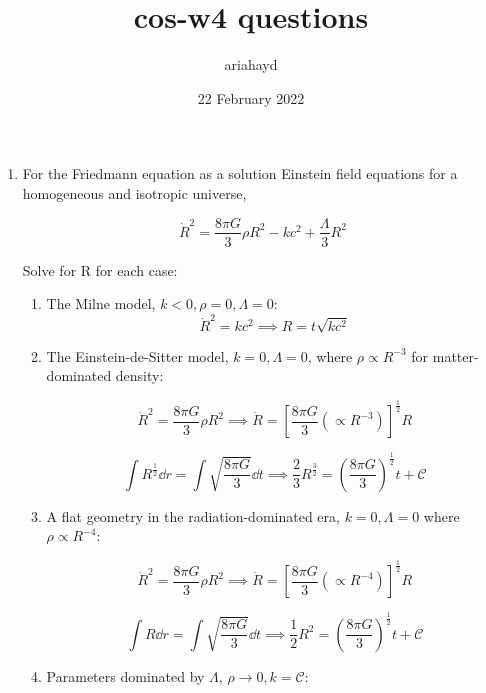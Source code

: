 \documentclass{paper}
\title{cos-w4 questions}
\author{ariahayd}
\date{22 February 2022}
\begin{document}
 

\maketitle

\begin{enumerate}
    \item %
      For the Friedmann equation as a solution Einstein field equations for
      a homogeneous and isotropic universe,

      \begin{equation}
        \dot{R}^2 = \frac{8 \pi G}{3}\rho R^2 - k c^2 + \frac{\Lambda}{3} R^2
        \label{eq:friedmann}
      \end{equation}

      Solve for R for each case:

      \begin{enumerate}
        \item
          The Milne model, \(k < 0, \rho = 0, \Lambda = 0\):
          \[ \dot{R}^2 = k c^2 \implies R = t \sqrt{kc^2} \]

        \item
          The Einstein-de-Sitter model, \(k = 0, \Lambda =0\), where 
          \(\rho \propto R^{-3}\) for matter-dominated density:

          \[ 
          \dot{R}^2 = \frac{8 \pi G}{3}\rho R^2 \implies
          \dot{R} = 
          \left[\frac{8 \pi G}{3}(\propto R^{-3})\right]^{\frac{1}{2}} R
          \] 

          \[
          \int R^{\frac{1}{2}}\dd{r} = \int \sqrt{\frac{8 \pi G}{3}}\dd{t}
          \implies \frac{2}{3}R^{\frac{3}{2}} 
          = \left(\frac{8 \pi G}{3}\right)^\frac{1}{2} t + \mathcal{C} 
          \]

        \item
          A flat geometry in the radiation-dominated era, 
          \(k = 0, \Lambda = 0 \) where \(\rho \propto R^{-4}\):

          \[ 
          \dot{R}^2 = \frac{8 \pi G}{3}\rho R^2 \implies
          \dot{R} = 
          \left[\frac{8 \pi G}{3}(\propto R^{-4})\right]^{\frac{1}{2}} R
          \] 

          \[
          \int R\dd{r} = \int \sqrt{\frac{8 \pi G}{3}}\dd{t}
          \implies \frac{1}{2}R^{2} 
          = \left(\frac{8 \pi G}{3}\right)^\frac{1}{2} t + \mathcal{C} 
          \]

        \item
          Parameters dominated by \(\Lambda\), \(\rho 
          \rightarrow 0, k=\mathcal{C}\):


\end{enumerate}
\end{enumerate}
\end{document}
